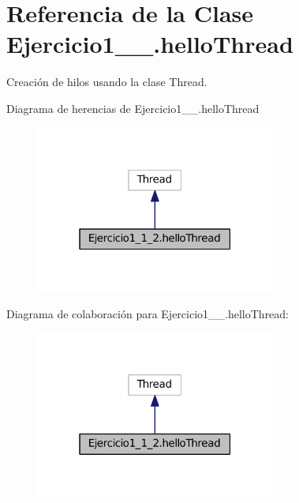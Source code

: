 \hypertarget{class_ejercicio1__1__2_1_1hello_thread}{}\section{Referencia de la Clase Ejercicio1\+\_\+\_.\+hello\+Thread}
\label{class_ejercicio1__1__2_1_1hello_thread}


Creación de hilos usando la clase Thread.  




Diagrama de herencias de Ejercicio1\+\_\+\_.\+hello\+Thread
\nopagebreak
\begin{figure}[H]
\begin{center}
\leavevmode
\includegraphics[width=223pt]{class_ejercicio1__1__2_1_1hello_thread__inherit__graph}
\end{center}
\end{figure}


Diagrama de colaboración para Ejercicio1\+\_\+\_.\+hello\+Thread\+:
\nopagebreak
\begin{figure}[H]
\begin{center}
\leavevmode
\includegraphics[width=223pt]{class_ejercicio1__1__2_1_1hello_thread__coll__graph}
\end{center}
\end{figure}
